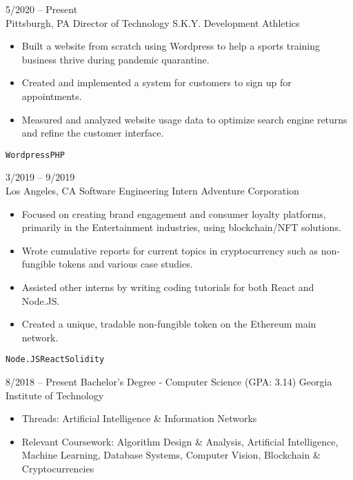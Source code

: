\documentclass[9pt]{developercv} %
\begin{document}
\begin{entrylist}
	\entry
		{5/2020 -- Present\\\footnotesize{Pittsburgh, PA}}
		{Director of Technology}
		{S.K.Y. Development Athletics}
		{\vspace{-\baselineskip}\begin{itemize}
			\item Built a website from scratch using Wordpress to help a sports training business thrive during pandemic quarantine.
			\item Created and implemented a system for customers to sign up for appointments.
 			\item Measured and analyzed website usage data to optimize search engine returns and refine the customer interface.
		\end{itemize}\texttt{Wordpress}\slashsep\texttt{PHP}}
	\entry
		{3/2019 -- 9/2019\\\footnotesize{Los Angeles, CA}}
		{Software Engineering Intern}
		{Adventure Corporation}
		{\vspace{-\baselineskip}\begin{itemize}
			\item Focused on creating brand engagement and consumer loyalty platforms, primarily in the Entertainment industries, using blockchain/NFT solutions.
 			\item Wrote cumulative reports for current topics in cryptocurrency such as non-fungible tokens and various case studies.
			\item Assisted other interns by writing coding tutorials for both React and Node.JS.
			\item Created a unique, tradable non-fungible token on the Ethereum main network.
		\end{itemize}\texttt{Node.JS}\slashsep\texttt{React}\slashsep\texttt{Solidity}}
\end{entrylist}


\vspace{-\baselineskip}

\begin{entrylist}
	\entry
		{8/2018 -- Present}
		{Bachelor's Degree - Computer Science (GPA: 3.14)}
		{Georgia Institute of Technology}
		{\vspace{-\baselineskip}\begin{itemize}
			\item Threads: Artificial Intelligence \& Information Networks
 			\item Relevant Coursework: Algorithm Design \& Analysis, Artificial Intelligence, Machine Learning, Database Systems, Computer Vision, Blockchain \& Cryptocurrencies
		\end{itemize}}
\end{entrylist}
\end{document}
